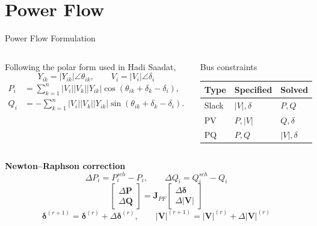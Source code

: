 \documentclass{beamer}
\begin{document}
\section{Power Flow}
\begin{frame}{Power Flow Formulation}
\begin{columns}[t,onlytextwidth]
\footnotesize
Following the polar form used in Hadi Saadat,
\[
Y_{ik}=|Y_{ik}|\angle\theta_{ik},\qquad V_i=|V_i|\angle\delta_i
\]
\begin{align*}
P_i&=\sum_{k=1}^{n}|V_i||V_k||Y_{ik}|\cos(\theta_{ik}+\delta_k-\delta_i),\\
Q_i&=-\sum_{k=1}^{n}|V_i||V_k||Y_{ik}|\sin(\theta_{ik}+\delta_k-\delta_i).
\end{align*}
\footnotesize
\begin{block}{Bus constraints}
\begin{tabular}{lll}
\toprule
Type & Specified & Solved \\
\midrule
Slack & $|V|,\delta$ & $P,Q$ \\
PV & $P,|V|$ & $Q,\delta$ \\
PQ & $P,Q$ & $|V|,\delta$ \\
\bottomrule
\end{tabular}
\end{block}
\end{columns}
\vspace{0.18cm}
\footnotesize
\textbf{Newton--Raphson correction}
\[
\Delta P_i=P_i^{sch}-P_i,\qquad \Delta Q_i=Q_i^{sch}-Q_i
\]
\[
\boxed{\begin{bmatrix}\Delta\bm P\\\Delta\bm Q\end{bmatrix}
=\bm J_{PF}\begin{bmatrix}\Delta\bm\delta\\\Delta|\bm V|\end{bmatrix}}
\]
\[
\bm\delta^{(r+1)}=\bm\delta^{(r)}+\Delta\bm\delta^{(r)},\qquad
|\bm V|^{(r+1)}=|\bm V|^{(r)}+\Delta|\bm V|^{(r)}
\]
\end{frame}
\end{document}
